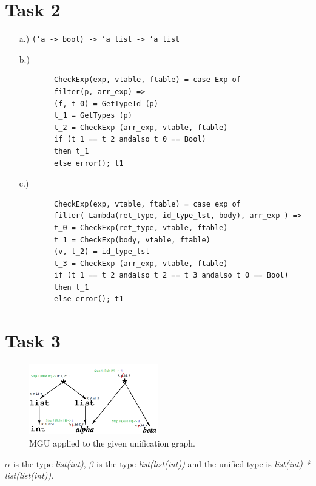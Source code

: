 \documentclass[11pt,a4paper]{article}
\theoremstyle{plain}
\theoremstyle{definition}
\theoremstyle{remark}
\numberwithin{equation}{section}
\begin{document}
\section{Task 2}
\begin{enumerate}
	\item[a.)] \texttt{(’a -> bool) -> ’a list -> ’a list}
	\item[b.)] \begin{verbatim}
		CheckExp(exp, vtable, ftable) = case Exp of
		filter(p, arr_exp) =>
		(f, t_0) = GetTypeId (p)
		t_1 = GetTypes (p)
		t_2 = CheckExp (arr_exp, vtable, ftable)
		if (t_1 == t_2 andalso t_0 == Bool)
		then t_1
		else error(); t1
	\end{verbatim}
	\item[c.)] \begin{verbatim}
		CheckExp(exp, vtable, ftable) = case exp of
		filter( Lambda(ret_type, id_type_lst, body), arr_exp ) =>
		t_0 = CheckExp(ret_type, vtable, ftable)
		t_1 = CheckExp(body, vtable, ftable)
		(v, t_2) = id_type_lst
		t_3 = CheckExp (arr_exp, vtable, ftable)
		if (t_1 == t_2 andalso t_2 == t_3 andalso t_0 == Bool)
		then t_1
		else error(); t1
	\end{verbatim}
\end{enumerate}


\section{Task 3}
\begin{figure}[H]
	\centering
	\includegraphics[width=0.5\textwidth]{img/mgu}
	\caption{MGU applied to the given unification graph.}
	\label{fig:mgu}
\end{figure}

$\alpha$ is the type \textit{list(int)}, $\beta$ is the type \textit{list(list(int))} and the unified type is \textit{list(int) * list(list(int))}.


\newpage


\end{document}
